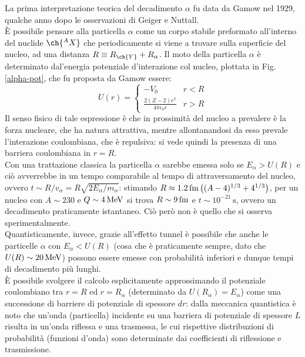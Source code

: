 La prima interpretazione teorica del decadimento $ \alpha $ fu data da Gamow nel 1929, qualche anno dopo le osservazioni di Geiger e Nuttall.\\
È possibile pensare alla particella $ \alpha $ come un corpo stabile preformato all'interno del nuclide $ \ch{^A X} $ che periodicamente si viene a trovare sulla superficie del nucleo, ad una distanza $ R \equiv R_{\ch{Y}} + R_{\alpha} $. Il moto della particella $ \alpha $ è determinato dal'energia potenziale d'interazione col nucleo, plottata in Fig. \ref{alpha-pot}, che fu proposta da Gamow essere:
\begin{equation}
	U(r) =
	\begin{cases}
		-V_0 & r < R \\
		\frac{2(Z-2)e^2}{4\pi \epsilon_0 r} & r > R
	\end{cases}
	\label{eq:2.12}
\end{equation}
Il senso fisico di tale espressione è che in prossimità del nucleo a prevalere è la forza nucleare, che ha natura attrattiva, mentre allontanandosi da esso prevale l'interazione coulombiana, che è repulsiva: si vede quindi la presenza di una barriera coulombiana in $ r = R $.\\
Con una trattazione classica la particella $ \alpha $ sarebbe emessa solo se $ E_{\alpha} > U(R) $ e ciò avverrebbe in un tempo comparabile al tempo di attraversamento del nucleo, ovvero $ t \sim R / v_{\alpha} = R \sqrt{2E_{\alpha} / m_{\alpha}} $: stimando $ R \approx 1.2\,\mathrm{fm} \left( (A - 4)^{1/3} + 4^{1/3} \right) $, per un nucleo con $ A \sim 230 $ e $ Q \sim 4\,\mathrm{MeV} $ si trova $ R \sim 9\,\mathrm{fm} $ e $ t \sim 10^{-21}\,\text{s} $, ovvero un decadimento praticamente istantaneo. Ciò però non è quello che si osserva sperimentalmente.\\
Quantisticamente, invece, grazie all'effetto tunnel è possibile che anche le particelle $ \alpha $ con $ E_{\alpha} < U(R) $ (cosa che è praticamente sempre, dato che $ U(R) \sim 20\,\mathrm{MeV} $) possono essere emesse con probabilità inferiori e dunque tempi di decadimento più lunghi.\\
È possibile svolgere il calcolo esplicitamente approssimando il potenziale coulombiano tra $ r = R $ ed $ r = R_{\alpha} $ (determinato da $ U(R_{\alpha}) = E_{\alpha} $) come una successione di barriere di potenziale di spessore $ dr $: dalla meccanica quantistica è noto che un'onda (particella) incidente su una barriera di potenziale di spessore $ L $ risulta in un'onda riflessa e una trasmessa, le cui rispettive distribuzioni di probabilità (funzioni d'onda) sono determinate dai coefficienti di riflessione e trasmissione.

